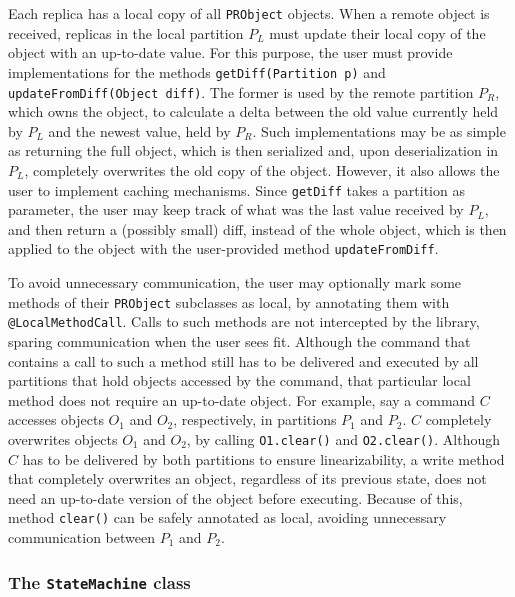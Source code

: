 \documentclass[10pt, conference, compsocconf, letterpaper]{IEEEtranv17}
\begin{document}
Each replica has a local copy of all \verb#PRObject# objects. 
When a remote object is received, replicas in the local partition $P_L$ must update their local copy of the object with an up-to-date value. 
For this purpose, the user must provide implementations for the methods \verb#getDiff(Partition p)# and \verb#updateFromDiff(Object diff)#. The former is used by the remote partition $P_R$, which owns the object, to calculate a delta between the old value currently held by $P_L$ and the newest value, held by $P_R$. Such implementations may be as simple as returning the full object, which is then serialized and, upon deserialization in $P_L$, completely overwrites the old copy of the object. However, it also allows the user to implement caching mechanisms. Since \verb#getDiff# takes a partition as parameter, the user may keep track of what was the last value received by $P_L$, and then return a (possibly small) diff, instead of the whole object, which is then applied to the object with the user-provided method \verb#updateFromDiff#.


To avoid unnecessary communication, the user may optionally mark some methods of their \verb#PRObject# subclasses as local, by annotating them with \verb#@LocalMethodCall#. Calls to such methods are not intercepted by the library, sparing communication when the user sees fit. Although the command that contains a call to such a method still has to be delivered and executed by all partitions that hold objects accessed by the command, that particular local method does not require an up-to-date object. For example, say a command $C$ accesses objects $O_1$ and $O_2$, respectively, in partitions $P_1$ and $P_2$. $C$ completely overwrites objects $O_1$ and $O_2$, by calling \verb#O1.clear()# and \verb#O2.clear()#. Although $C$ has to be delivered by both partitions to ensure linearizability, a write method that completely overwrites an object, regardless of its previous state, does not need an up-to-date version of the object before executing. Because of this, method \verb#clear()# can be safely annotated as local, avoiding unnecessary communication between $P_1$ and $P_2$.


\subsubsection{The \texttt{StateMachine} class}
\end{document}
